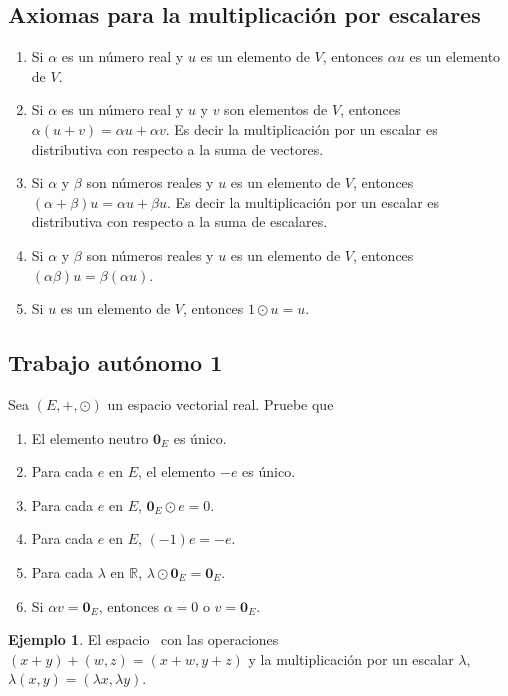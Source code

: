 \documentclass[10pt,a4paper]{amsbook}
\theoremstyle{definition}
\newtheorem{ejemplo}[theorem]{Ejemplo}
\theoremstyle{remark}
\numberwithin{section}{chapter}
\numberwithin{equation}{chapter}
\begin{document}
\subsection*{Axiomas para la multiplicación por escalares}
\begin{enumerate}
\item Si $\alpha$ es un número real y $u$ es un elemento de $V$, entonces $\alpha u$ es un elemento de $V$.
\item Si $\alpha$ es un número real y $u$ y $v$ son elementos de $V$, entonces $\alpha (u+v) = \alpha u + \alpha v$. Es decir la multiplicación por un escalar es distributiva con respecto a la suma de vectores.
\item Si $\alpha$ y $\beta$ son números reales y $u$ es un elemento de $V$, entonces $(\alpha + \beta)u = \alpha u + \beta u$. Es decir la multiplicación por un escalar es distributiva con respecto a la suma de escalares.
\item Si $\alpha$ y $\beta$ son números reales y $u$ es un elemento de $V$, entonces $(\alpha \beta)u = \beta(\alpha u)$.
\item Si $u$ es un elemento de $V$, entonces $1 \odot u = u$.

\end{enumerate}

\subsection*{Trabajo autónomo 1}
Sea $(E, +, \odot)$ un espacio vectorial real. Pruebe que
\begin{enumerate}
\item El elemento neutro $\mathbf{0}_E$ es único.
\item Para cada $e$ en $E$, el elemento $-e$ es único.
\item Para cada $e$ en $E$, $\mathbf{0}_E \odot e = 0$.
\item Para cada $e$ en $E$, $(-1)e = -e$.
\item Para cada $\lambda$ en $\mathbb{R}$, $\lambda \odot \mathbf{0}_E = \mathbf{0}_E$.
\item Si $\alpha v = \mathbf{0}_E$, entonces $\alpha = 0$ o $v=\mathbf{0}_E$.

\end{enumerate}

\begin{ejemplo}

El espacio \rdos \ con las operaciones $(x+y)+(w,z) = (x+w,y+z)$ y la multiplicación por un escalar $\lambda$, $\lambda (x,y) = (\lambda x,\lambda y)$.

\end{ejemplo}
\end{document}
